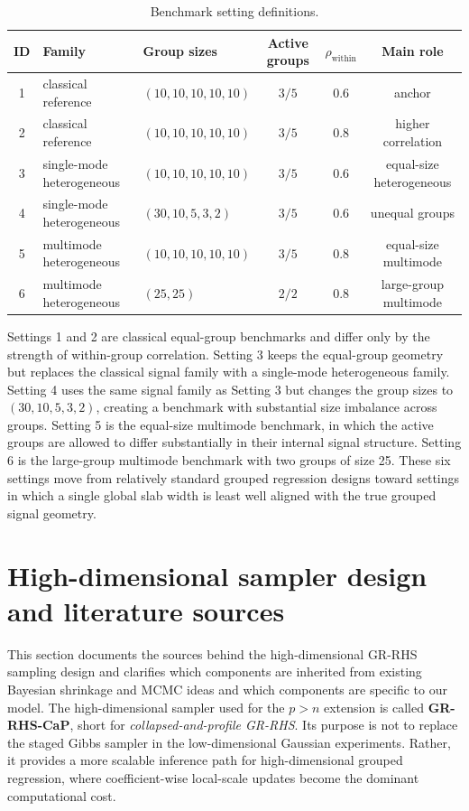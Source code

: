 \documentclass[11pt]{article}
\begin{document}
\begin{table}[H]
\centering
\caption{Benchmark setting definitions.}
\label{tab:benchmark-settings}
\begin{tabular}{cllccc}
\toprule
ID & Family & Group sizes & Active groups & \(\rho_{\mathrm{within}}\) & Main role \\
\midrule
1 & classical reference & \((10,10,10,10,10)\) & \(3/5\) & 0.6 & anchor \\
2 & classical reference & \((10,10,10,10,10)\) & \(3/5\) & 0.8 & higher correlation \\
3 & single-mode heterogeneous & \((10,10,10,10,10)\) & \(3/5\) & 0.6 & equal-size heterogeneous \\
4 & single-mode heterogeneous & \((30,10,5,3,2)\) & \(3/5\) & 0.6 & unequal groups \\
5 & multimode heterogeneous & \((10,10,10,10,10)\) & \(3/5\) & 0.8 & equal-size multimode \\
6 & multimode heterogeneous & \((25,25)\) & \(2/2\) & 0.8 & large-group multimode \\
\bottomrule
\end{tabular}
\end{table}

Settings 1 and 2 are classical equal-group benchmarks and differ only by the
strength of within-group correlation. Setting 3 keeps the equal-group geometry
but replaces the classical signal family with a single-mode heterogeneous
family. Setting 4 uses the same signal family as Setting 3 but changes the
group sizes to \((30,10,5,3,2)\), creating a benchmark with substantial size
imbalance across groups. Setting 5 is the equal-size multimode benchmark, in
which the active groups are allowed to differ substantially in their internal
signal structure. Setting 6 is the large-group multimode benchmark with two
groups of size 25. These six settings move from relatively standard grouped
regression designs toward settings in which a single global slab width is least
well aligned with the true grouped signal geometry.

\section{High-dimensional sampler design and literature sources}

This section documents the sources behind the high-dimensional GR-RHS sampling
design and clarifies which components are inherited from existing Bayesian
shrinkage and MCMC ideas and which components are specific to our model. The
high-dimensional sampler used for the \(p>n\) extension is called
\textbf{GR-RHS-CaP}, short for \emph{collapsed-and-profile GR-RHS}. Its purpose
is not to replace the staged Gibbs sampler in the low-dimensional Gaussian
experiments. Rather, it provides a more scalable inference path for
high-dimensional grouped regression, where coefficient-wise local-scale updates
become the dominant computational cost.
\end{document}
